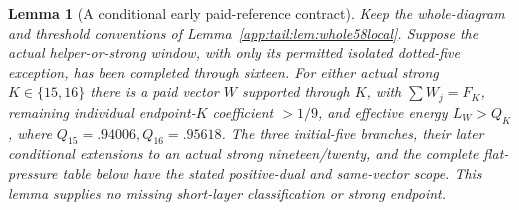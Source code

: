 \documentclass[11pt]{article}
\newtheorem{lemma}[theorem]{Lemma}
\theoremstyle{definition}
\theoremstyle{remark}
\begin{document}
\begin{lemma}[A conditional early paid-reference contract]
\label{app:tail:lem:whole58reference}
Keep the whole-diagram and threshold conventions of
Lemma~\ref{app:tail:lem:whole58local}. Suppose the actual helper-or-strong
window, with only its permitted isolated dotted-five exception, has
been completed through sixteen. For either actual strong
$K\in\{15,16\}$ there is a paid vector $W$ supported through $K$,
with $\sum W_j=F_K$, remaining individual endpoint-$K$ coefficient
$>1/9$, and effective energy $L_W>Q_K$, where
$Q_{15}=.94006,Q_{16}=.95618$. The three initial-five branches,
their later conditional extensions to an actual strong nineteen/twenty,
and the complete flat-pressure table below have the stated positive-dual
and same-vector scope. This lemma supplies no missing short-layer
classification or strong endpoint.
\end{lemma}
\end{document}
